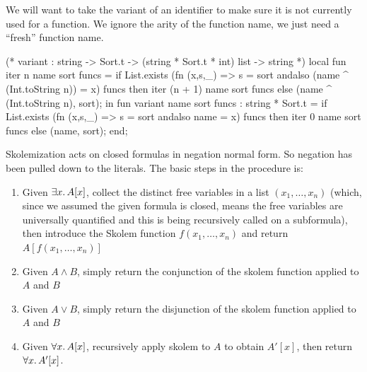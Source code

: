 \begin{node}
We will want to take the variant of an identifier to make sure it is
not currently used for a function. We ignore the arity of the function
name, we just need a ``fresh'' function name.
\end{node}

\nwenddocs{}\endmoddef\nwstartdeflinemarkup{}\nwenddeflinemarkup
(* variant : string -> Sort.t -> (string * Sort.t * int) list -> string *)
local
  fun iter n name sort funcs =
    if List.exists (fn (x,s,_) =>
                       s = sort andalso
                       (name ^ (Int.toString n)) = x)
                   funcs
    then iter (n + 1) name sort funcs
    else (name ^ (Int.toString n), sort);
in
fun variant name sort funcs : string * Sort.t =
  if List.exists (fn (x,s,_) => s = sort andalso name = x)
                 funcs
  then iter 0 name sort funcs
  else (name, sort);
end;
\nwendcode{}\nwdocspar

\begin{node}
Skolemization acts on closed formulas in negation normal form.
So negation has been pulled down to the literals. The basic steps in the procedure is:
\begin{enumerate}
\item Given $\exists x\ldotp A[x]$, collect the distinct free
  variables in a list $(x_{1},\dots,x_{n})$ (which, since we assumed
  the given formula is closed, means the free variables are
  universally quantified and this is being recursively called on a
  subformula), then introduce the Skolem
  function $f(x_{1},\dots,x_{n})$ and return $A[f(x_{1},\dots,x_{n})]$
\item Given $A\land B$, simply return the conjunction of the
  {\Tt{}skolem\nwendquote} function applied to $A$ and $B$
\item Given $A\lor B$, simply return the disjunction of the
  {\Tt{}skolem\nwendquote} function applied to $A$ and $B$
\item Given $\forall x\ldotp A[x]$, recursively apply {\Tt{}skolem\nwendquote} to
  $A$ to obtain $A'[x]$, then return $\forall x\ldotp A'[x]$.
\end{enumerate}
\end{node}

